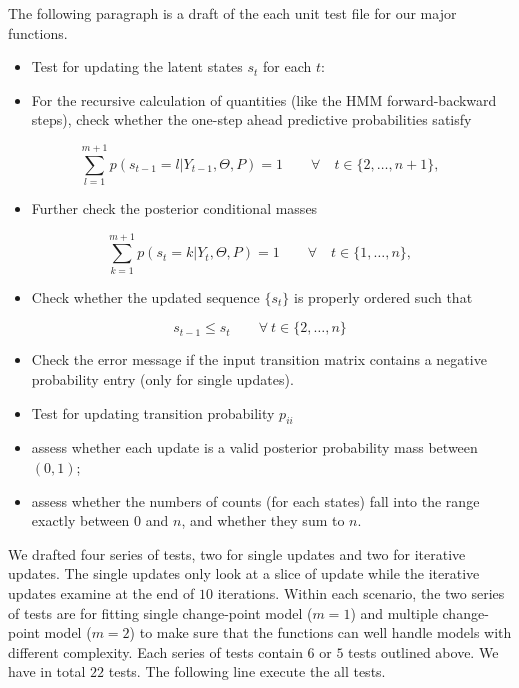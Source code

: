 \documentclass{article}
\begin{document}
The following paragraph is a draft of the each unit test file for our
major functions.

\begin{itemize}
\item
  Test for updating the latent states $s_{t}$ for each $t$:
\item
  For the recursive calculation of quantities (like the HMM
  forward-backward steps), check whether the one-step ahead predictive
  probabilities satisfy
\end{itemize}

\[\sum_{l=1}^{m+1} p(s_{t-1}=l|Y_{t-1},\Theta,P)=1\qquad\forall\quad t\in\{2,\ldots,n+1\},\]

\begin{itemize}
\itemsep1pt\parskip0pt
\item
  Further check the posterior conditional masses
\end{itemize}

\[\sum_{k=1}^{m+1} p(s_t=k|Y_t,\Theta,P)=1\qquad\forall\quad t\in\{1,\ldots,n\},\]

\begin{itemize}
\itemsep1pt\parskip0pt
\item
  Check whether the updated sequence $\{s_t\}$ is properly ordered such
  that
\end{itemize}

\[s_{t-1} \leq s_{t}\qquad\forall~t\in \{2,\ldots,n\}\]

\begin{itemize}
\item
  Check the error message if the input transition matrix contains a
  negative probability entry (only for single updates).
\item
  Test for updating transition probability $p_{ii}$
\item
  assess whether each update is a valid posterior probability mass
  between $(0,1)$;
\item
  assess whether the numbers of counts (for each states) fall into the
  range exactly between $0$ and $n$, and whether they sum to $n$.
\end{itemize}

We drafted four series of tests, two for single updates and two for
iterative updates. The single updates only look at a slice of update
while the iterative updates examine at the end of $10$ iterations.
Within each scenario, the two series of tests are for fitting single
change-point model ($m=1$) and multiple change-point model ($m=2$) to
make sure that the functions can well handle models with different
complexity. Each series of tests contain $6$ or $5$ tests outlined
above. We have in total $22$ tests. The following line execute the all
tests.
\end{document}
